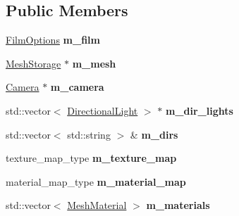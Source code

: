 \subsection*{Public Members}
\begin{DoxyCompactItemize}
\item 
\mbox{\label{structpbrt_1_1_fermat_importer_aebba36dcc493c854185d842beb3c037b}} 
\hyperlink{structpbrt_1_1_film_options}{Film\+Options} {\bfseries m\+\_\+film}
\item 
\mbox{\label{structpbrt_1_1_fermat_importer_a3365085768715733ea57f95564f517a6}} 
\hyperlink{class_mesh_storage}{Mesh\+Storage} $\ast$ {\bfseries m\+\_\+mesh}
\item 
\mbox{\label{structpbrt_1_1_fermat_importer_a4cc226526344ae8c320c2817546f7a0d}} 
\hyperlink{struct_camera}{Camera} $\ast$ {\bfseries m\+\_\+camera}
\item 
\mbox{\label{structpbrt_1_1_fermat_importer_ad76f30f5b33fad42b6cd1772aea76cba}} 
std\+::vector$<$ \hyperlink{struct_directional_light}{Directional\+Light} $>$ $\ast$ {\bfseries m\+\_\+dir\+\_\+lights}
\item 
\mbox{\label{structpbrt_1_1_fermat_importer_ad8413f2755260e10da7af323701bc9a3}} 
std\+::vector$<$ std\+::string $>$ \& {\bfseries m\+\_\+dirs}
\item 
\mbox{\label{structpbrt_1_1_fermat_importer_aa5fa1f066ad6093015ca8d0dade15587}} 
texture\+\_\+map\+\_\+type {\bfseries m\+\_\+texture\+\_\+map}
\item 
\mbox{\label{structpbrt_1_1_fermat_importer_a9a3dda06a3dae04bff14b30da601ab31}} 
material\+\_\+map\+\_\+type {\bfseries m\+\_\+material\+\_\+map}
\item 
\mbox{\label{structpbrt_1_1_fermat_importer_aa76c976b638acf08531e1c57a29499b6}} 
std\+::vector$<$ \hyperlink{struct_mesh_material}{Mesh\+Material} $>$ {\bfseries m\+\_\+materials}
\item 
\mbox{\label{structpbrt_1_1_fermat_importer_adadaefa9250f28b897c4da594e9ba216}} 

\end{DoxyCompactItemize}
